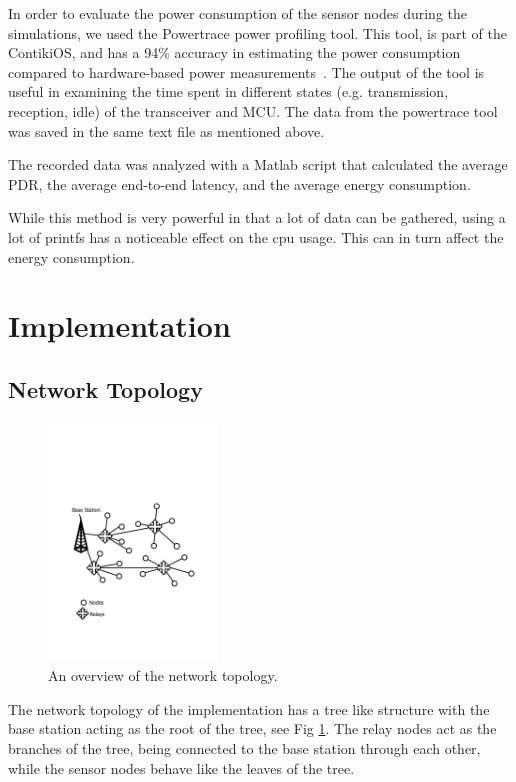 \documentclass[conference]{IEEEtran}
\begin{document}
In order to evaluate the power consumption of the sensor nodes during the
simulations, we used the Powertrace power profiling tool. This tool, is part of
the ContikiOS, and has a 94\% accuracy in estimating the power consumption
compared to hardware-based power measurements~\cite{powertrace}.  The output of
the tool is useful in examining the time spent in different states (e.g.
transmission, reception, idle) of the transceiver and MCU. The data from the
powertrace tool was saved in the same text file as mentioned above.

The recorded data was analyzed with a Matlab script that calculated the average
PDR, the average end-to-end latency, and the average energy consumption.

While this method is very powerful in that a lot of data can be gathered, using
a lot of printfs has a noticeable effect on the cpu usage. This can in turn
affect the energy consumption.


\section{Implementation}

\subsection{Network Topology}

\begin{figure}
    \centering
    \includegraphics[trim= 0 150  0 150, clip, width=0.4\textwidth]{Figure1.pdf}
    \caption{An overview of the network topology.}
    \label{fig:topology}
\end{figure}

The network topology of the implementation has a tree like structure with
the base station acting as the root of the tree, see Fig \ref{fig:topology}.
The relay nodes act as the branches of the tree, being connected to the base
station through each other, while the sensor nodes behave like the leaves of
the tree.
\end{document}
